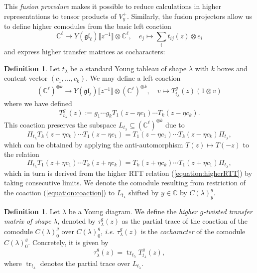 \documentclass[11pt]{report}
\theoremstyle{definition}
\newtheorem{definition}[theorem]{Definition}
\theoremstyle{remark}
\theoremstyle{remark}
\newcommand{\C}{\mathbb{C}}
\begin{document}
This \emph{fusion procedure} makes it possible to reduce calculations in higher representations to tensor products of $V_y^+$. Similarly, the fusion projectors allow us to define higher comodules from the basic left coaction
\begin{equation*}
\C^\ell \to Y(\mathfrak{gl}_\ell)\llbracket z^{-1} \rrbracket \otimes \C^\ell, \quad e_j \mapsto \sum_i t_{ij}(z) \otimes e_i
\end{equation*}
and express higher transfer matrices as cocharacters:

\begin{definition}
Let $t_\lambda$ be a standard Young tableau of shape $\lambda$ with $k$ boxes and content vector $(c_1,...,c_k)$. We may define a left coaction
\begin{align}\label{equation:coaction}
(\C^\ell)^{\otimes k} \to Y(\mathfrak{gl}_\ell)\llbracket z^{-1} \rrbracket \otimes (\C^\ell)^{\otimes k}, \quad v \mapsto T_{t_\lambda}^g(z)(1 \otimes v)
\end{align}
where we have defined
\begin{equation*}
T_{t_\lambda}^g(z) := g_1 \cdots g_k T_1(z-\eta c_1) \cdots T_k(z-\eta c_k).
\end{equation*}
This coaction preserves the subspace $L_{t_\lambda} \subseteq (\C^\ell)^{\otimes k}$ due to
\begin{equation*}
\Pi_{t_\lambda} T_k(z-\eta c_k) \cdots T_1(z-\eta c_1) = T_1(z-\eta c_1) \cdots T_k(z-\eta c_k) \Pi_{t_\lambda},
\end{equation*}
which can be obtained by applying the anti-automorphism $T(z) \mapsto T(-z)$ to the relation
\begin{equation*}
\Pi_{t_\lambda} T_1(z+\eta c_1) \cdots T_k(z+\eta c_k) = T_k(z+\eta c_k) \cdots T_1(z+\eta c_1) \Pi_{t_\lambda},
\end{equation*}
which in turn is derived from the higher RTT relation (\ref{equation:higherRTT}) by taking consecutive limits. We denote the comodule resulting from restriction of the coaction (\ref{equation:coaction}) to $L_{t_\lambda}$ shifted by $y \in \C$ by $C(\lambda)_y^g$.
\end{definition}

\begin{definition}
Let $\lambda$ be a Young diagram. We define the \emph{higher $g$-twisted transfer matrix of shape $\lambda$}, denoted by $\tau_\lambda^g(z)$ as the partial trace of the coaction of the comodule $C(\lambda)_0^g$ over $C(\lambda)_0^g$, \emph{i.e.} $\tau_\lambda^g(z)$ is the \emph{cocharacter} of the comodule $C(\lambda)_0^g$. Concretely, it is given by
\begin{equation*}
\tau_\lambda^g(z) = \operatorname{tr}_{t_\lambda} T_{t_\lambda}^g(z),
\end{equation*}
where $\operatorname{tr}_{t_\lambda}$ denotes the partial trace over $L_{t_\lambda}$.
\end{definition}
\end{document}

